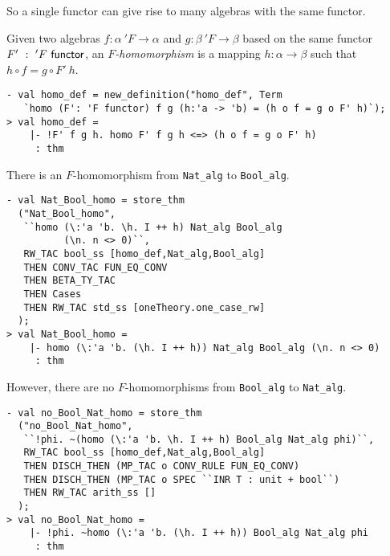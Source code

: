 So a single functor can give rise to many algebras with the same functor.

Given two algebras $f : \alpha~'F \rightarrow \alpha$ and $g : \beta~'F \rightarrow \beta$
based on the same functor $F'~:~'F~\mbox{\sf functor}$,
an {\it $F$-homomorphism}\/ is a mapping $h : \alpha \rightarrow \beta$ such that
$h \circ f = g \circ F'~h$.
\begin{session}
\begin{verbatim}
- val homo_def = new_definition("homo_def", Term
   `homo (F': 'F functor) f g (h:'a -> 'b) = (h o f = g o F' h)`);
> val homo_def =
    |- !F' f g h. homo F' f g h <=> (h o f = g o F' h)
     : thm
\end{verbatim}
\end{session}

There is an $F$-homomorphism from \texttt{Nat\_alg} to \texttt{Bool\_alg}.
\begin{session}
\begin{verbatim}
- val Nat_Bool_homo = store_thm
  ("Nat_Bool_homo",
   ``homo (\:'a 'b. \h. I ++ h) Nat_alg Bool_alg
          (\n. n <> 0)``,
   RW_TAC bool_ss [homo_def,Nat_alg,Bool_alg]
   THEN CONV_TAC FUN_EQ_CONV
   THEN BETA_TY_TAC
   THEN Cases
   THEN RW_TAC std_ss [oneTheory.one_case_rw]
  );
> val Nat_Bool_homo =
    |- homo (\:'a 'b. (\h. I ++ h)) Nat_alg Bool_alg (\n. n <> 0)
     : thm
\end{verbatim}
\end{session}

However, there are no $F$-homomorphisms from \texttt{Bool\_alg} to \texttt{Nat\_alg}.
\begin{session}
\begin{verbatim}
- val no_Bool_Nat_homo = store_thm
  ("no_Bool_Nat_homo",
   ``!phi. ~(homo (\:'a 'b. \h. I ++ h) Bool_alg Nat_alg phi)``,
   RW_TAC bool_ss [homo_def,Nat_alg,Bool_alg]
   THEN DISCH_THEN (MP_TAC o CONV_RULE FUN_EQ_CONV)
   THEN DISCH_THEN (MP_TAC o SPEC ``INR T : unit + bool``)
   THEN RW_TAC arith_ss []
  );
> val no_Bool_Nat_homo =
    |- !phi. ~homo (\:'a 'b. (\h. I ++ h)) Bool_alg Nat_alg phi
     : thm
\end{verbatim}
\end{session}


